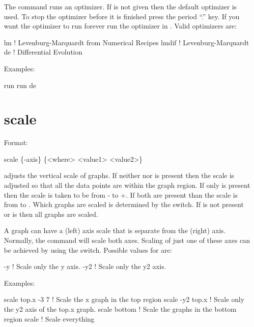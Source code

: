 {{{
\vskip 0.2in 
The  command runs an optimizer. If  is not
given then the default optimizer is used. To stop the optimizer before
it is finished press the period ``.''  key. If you want the optimizer
to run forever run the optimizer in . Valid optimizers
are:
\begin{example}
  lm            ! Levenburg-Marquardt from Numerical Recipes 
  lmdif         ! Levenburg-Marquardt 
  de            ! Differential Evolution
\end{example}

Examples:
\begin{example}
  run 
  run de
\end{example}

\section{scale}
\label{s:scale}

Format:
\begin{example}
  scale \{-axis\} \{<where> <value1> <value2>\}
\end{example}

\vskip 0.2in 
 adjusts the vertical scale of graphs. If neither
 nor  is present then the scale is adjusted
so that all the data points are within the graph region.  If only
 is present then the scale is taken to be from
- to +. If both are present than the scale
is from  to .  Which graphs are scaled is
determined by the  switch. If  is not present
or  is  then all graphs are scaled.

A graph can have a  (left) axis scale that is separate from the  (right) 
axis. Normally, the  command will scale both axes.  Scaling of just one of these
axes can be achieved by using the  switch. Possible values for  are:
\begin{example}
  -y                 ! Scale only the y axis.
  -y2                ! Scale only the y2 axis.
\end{example}

Examples:
\begin{example}
  scale top.x -3  7  ! Scale the x graph in the top region
  scale -y2 top.x    ! Scale only the y2 axis of the top.x graph.
  scale bottom       ! Scale the graphs in the bottom region
  scale              ! Scale everything
\end{example}


}}}
